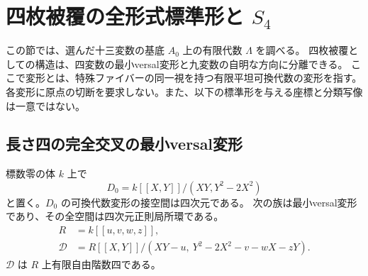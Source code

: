 \section{四枚被覆の全形式標準形と $S_4$}\label{sec:four-versal-v23}

この節では、選んだ十三変数の基底 $A_0$ 上の有限代数 $\Lambda$ を調べる。
四枚被覆としての構造は、四変数の最小versal変形と九変数の自明な方向に分離できる。
ここで変形とは、特殊ファイバーの同一視を持つ有限平坦可換代数の変形を指す。
各変形に原点の切断を要求しない。また、以下の標準形を与える座標と分類写像は一意ではない。

\subsection{長さ四の完全交叉の最小versal変形}

\begin{lemma}\label{lem:four-miniversal-v23}
標数零の体 $k$ 上で
\[
 D_0=k[[X,Y]]/(XY,Y^2-2X^2)
\]
と置く。$D_0$ の可換代数変形の接空間は四次元である。
次の族は最小versal変形であり、その全空間は四次元正則局所環である。
\begin{align}
 R&=k[[u,v,w,z]],\\
 \mathscr D&=R[[X,Y]]/(XY-u,\ Y^2-2X^2-v-wX-zY).
 \label{eq:four-miniversal-v23}
\end{align}
$\mathscr D$ は $R$ 上有限自由階数四である。
\end{lemma}

